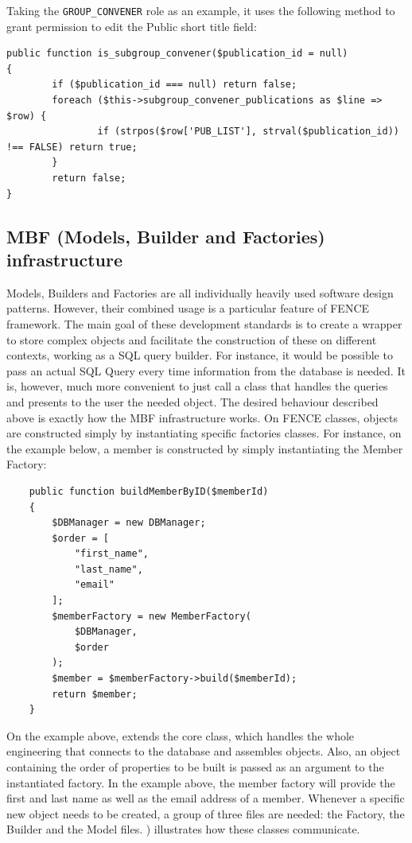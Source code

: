 Taking the \texttt{GROUP\_CONVENER} role as an example, it uses the following method to grant permission to edit the Public short title field:

\begin{lstlisting}
public function is_subgroup_convener($publication_id = null)
{
        if ($publication_id === null) return false;
        foreach ($this->subgroup_convener_publications as $line => $row) {
                if (strpos($row['PUB_LIST'], strval($publication_id)) !== FALSE) return true;
        }
        return false;
}
\end{lstlisting}


\subsection{MBF (Models, Builder and Factories) infrastructure}%
\label{sec:MBF_Models_Builder_and_Factories_infrastructure}

Models, Builders and Factories are all individually heavily used software design patterns.
However, their combined usage is a particular feature of FENCE framework.
The main goal of these development standards is to create a wrapper to store complex objects and facilitate the construction of these on different contexts, working as a SQL query builder.
For instance, it would be possible to pass an actual SQL Query every time information from the database is needed.
It is, however, much more convenient to just call a class that handles the queries and presents to the user the needed object.
The desired behaviour described above is exactly how the MBF infrastructure works.
On FENCE classes, objects are constructed simply by instantiating specific factories classes.
For instance, on the example below, a member is constructed by simply instantiating the Member Factory:

\begin{lstlisting}
    public function buildMemberByID($memberId)
    {
        $DBManager = new DBManager;
        $order = [
            "first_name",
            "last_name",
            "email"
        ];
        $memberFactory = new MemberFactory(
            $DBManager,
            $order
        );
        $member = $memberFactory->build($memberId);
        return $member;
    }
\end{lstlisting}

On the example above,  extends the core  class, which handles the whole engineering that connects to the database and assembles objects. Also, an object containing the order of properties to be built is passed as an argument to the instantiated factory. In the example above, the member factory will provide the first and last name as well as the email address of a member.
Whenever a specific new object needs to be created, a group of three files are needed:
the Factory, the Builder and the Model files. ) illustrates how these classes communicate.

